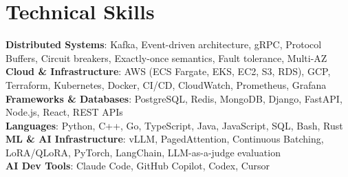 \documentclass[letterpaper,11pt]{article}
\begin{document}
\section{Technical Skills}
\vspace{-7pt}
\begin{itemize}
[leftmargin=0.15in, label={}]\small{\item{
        \textbf{Distributed Systems}{: Kafka, Event-driven architecture, gRPC, Protocol Buffers, Circuit breakers, Exactly-once semantics, Fault tolerance, Multi-AZ} \\
        \textbf{Cloud \& Infrastructure}{: AWS (ECS Fargate, EKS, EC2, S3, RDS), GCP, Terraform, Kubernetes, Docker, CI/CD, CloudWatch, Prometheus, Grafana} \\
        \textbf{Frameworks \& Databases}{: PostgreSQL, Redis, MongoDB, Django, FastAPI, Node.js, React, REST APIs} \\
        \textbf{Languages}{: Python, C++, Go, TypeScript, Java, JavaScript, SQL, Bash, Rust} \\
        \textbf{ML \& AI Infrastructure}{: vLLM, PagedAttention, Continuous Batching, LoRA/QLoRA, PyTorch, LangChain, LLM-as-a-judge evaluation} \\
        \textbf{AI Dev Tools}{: Claude Code, GitHub Copilot, Codex, Cursor} \\
}}
\end{itemize}
\end{document}
